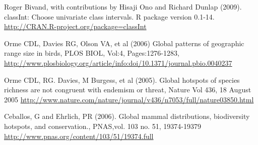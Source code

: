 \documentclass[ a4paper ]{article}
\begin{document}
\begin{thebibliography}{1}
Roger Bivand, with contributions by Hisaji Ono and Richard Dunlap (2009). classInt: Choose univariate class intervals. R package version 0.1-14. \url{http://CRAN.R-project.org/package=classInt}

Orme CDL, Davies RG, Olson VA, et al (2006) Global patterns of geographic range size in birds, PLOS BIOL, Vol:4, Pages:1276-1283, 
\url{http://www.plosbiology.org/article/info:doi/10.1371/journal.pbio.0040237 }

Orme CDL, RG. Davies, M Burgess, et al (2005). Global hotspots of species richness are not congruent with endemism or threat, Nature Vol 436, 18 August 2005 \url{http://www.nature.com/nature/journal/v436/n7053/full/nature03850.html}

Ceballos, G and Ehrlich, PR (2006). Global mammal distributions, biodiversity hotspots, and conservation., PNAS,vol. 103 no. 51, 19374-19379  \url{http://www.pnas.org/content/103/51/19374.full}








\end{thebibliography}
\end{document}
